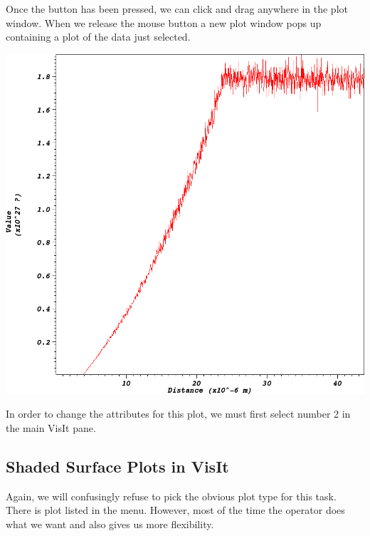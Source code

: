   Once the button has been pressed, we can click and drag anywhere in
  the  plot window. When we release the mouse button a
  new plot window pops up containing a  plot of the data just
  selected.
  \begin{center}
    \includegraphics[width=0.8\linewidth]{images/visit_curve}
  \end{center}

  In order to change the attributes for this plot, we must first select
   number 2 in the main VisIt pane.

\subsection{Shaded Surface Plots in VisIt}
  Again, we will confusingly refuse to pick the obvious plot type for this
  task. There is  plot listed in the menu. However, most of the
  time the  operator does what we want and also gives us more
  flexibility.

